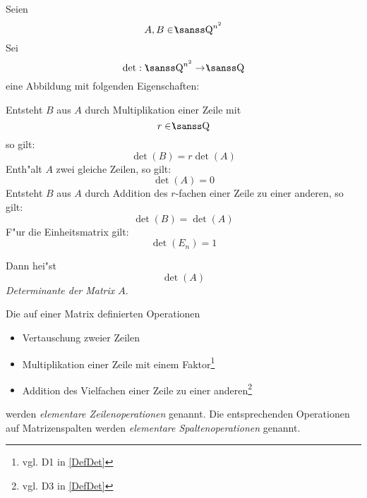 \MyBeginDef
{}
\label{DefDet}
    Seien \[ A,B \in \Rationals^{n^2} \]
    Sei \[ \det : \: \Rationals^{n^2} \rightarrow \Rationals \]
    eine Abbildung mit folgenden Eigenschaften:
    \begin{MyDescription}
        Entsteht $B$ aus $A$ durch Multiplikation einer Zeile mit
        \[ r \in \Rationals \] so gilt:
        \[ \det(B) = r \det(A) \]
        Enth"alt $A$ zwei gleiche Zeilen, so gilt:
        \[ \det(A) = 0 \]
        Entsteht $B$ aus $A$ durch Addition des $r$-fachen einer Zeile zu
        einer anderen, so gilt:
        \[ \det(B) = \det(A) \]
     F"ur die Einheitsmatrix gilt:
        \[ \det(E_n) = 1 \]
    \end{MyDescription}
    Dann hei"st
    \[ \det(A) \] {\em Determinante der Matrix $A$}.
\MyEndDef

\MyBeginDef
\label{DefZeilenOp}
    Die auf einer Matrix definierten Operationen
    \begin{itemize}
    \item 
          Vertauschung zweier Zeilen 
    \item 
          Multiplikation einer Zeile mit einem 
          Faktor\footnote{vgl. D1 in \ref{DefDet}}
    \item 
          Addition des Vielfachen einer Zeile zu einer 
          anderen\footnote{vgl. D3 in \ref{DefDet}}
    \end{itemize}
    werden {\em elementare Zeilenoperationen} genannt. Die entsprechenden
    Operationen auf Matrizenspalten werden 
    {\em elementare Spaltenoperationen} genannt.
\MyEndDef

